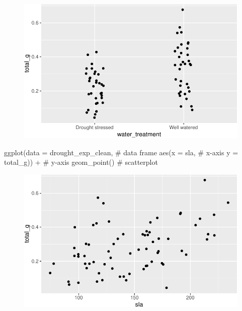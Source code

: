 \documentclass[
  letterpaper,
  DIV=11,
  numbers=noendperiod]{scrartcl}
\newenvironment{Shaded}{\begin{snugshade}}{\end{snugshade}}
\newcommand{\AttributeTok}[1]{\textcolor[rgb]{0.40,0.45,0.13}{#1}}
\newcommand{\CommentTok}[1]{\textcolor[rgb]{0.37,0.37,0.37}{#1}}
\newcommand{\FunctionTok}[1]{\textcolor[rgb]{0.28,0.35,0.67}{#1}}
\newcommand{\NormalTok}[1]{\textcolor[rgb]{0.00,0.23,0.31}{#1}}
\newcommand{\SpecialCharTok}[1]{\textcolor[rgb]{0.37,0.37,0.37}{#1}}
\begin{document}
\begin{figure}[H]

{\centering \includegraphics{Odile_Gabbiani_homework-03_files/figure-pdf/unnamed-chunk-5-1.pdf}

}

\end{figure}

\begin{Shaded}
\begin{Highlighting}[]
\FunctionTok{ggplot}\NormalTok{(}\AttributeTok{data =}\NormalTok{ drought\_exp\_clean, }\CommentTok{\# data frame}
       \FunctionTok{aes}\NormalTok{(}\AttributeTok{x =}\NormalTok{ sla, }\CommentTok{\# x{-}axis}
           \AttributeTok{y =}\NormalTok{ total\_g)) }\SpecialCharTok{+} \CommentTok{\# y{-}axis}
  \FunctionTok{geom\_point}\NormalTok{() }\CommentTok{\# scatterplot}
\end{Highlighting}
\end{Shaded}

\begin{figure}[H]

{\centering \includegraphics{Odile_Gabbiani_homework-03_files/figure-pdf/unnamed-chunk-6-1.pdf}

}

\end{figure}
\end{document}
